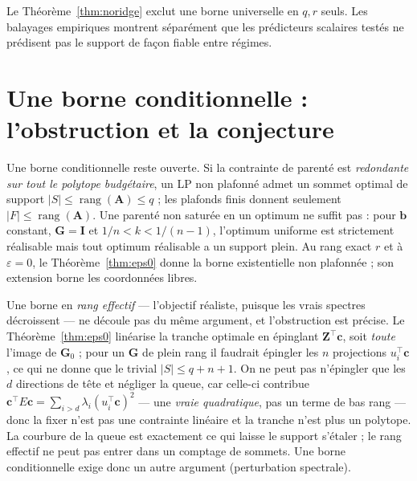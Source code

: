 \documentclass[11pt]{article}
\theoremstyle{plain}
\newcommand{\tp}{^{\top}}
\newcommand{\bc}{\mathbf{c}}
\newcommand{\bb}{\mathbf{b}}
\newcommand{\bG}{\mathbf{G}}
\newcommand{\bZ}{\mathbf{Z}}
\newcommand{\bA}{\mathbf{A}}
\begin{document}
Le Théorème~\ref{thm:noridge} exclut une borne universelle en $q,r$ seuls. Les balayages empiriques montrent séparément que les prédicteurs scalaires testés ne prédisent pas le support de façon fiable entre régimes.

\section{Une borne conditionnelle : l'obstruction et la conjecture}

Une borne conditionnelle reste ouverte. Si la contrainte de parenté est \emph{redondante sur tout le polytope budgétaire}, un LP non plafonné admet un sommet optimal de support $|S|\le\operatorname{rang}(\bA)\le q$ ; les plafonds finis donnent seulement $|F|\le\operatorname{rang}(\bA)$. Une parenté non saturée en un optimum ne suffit pas : pour $\bb$ constant, $\bG=\mathbf{I}$ et $1/n<k<1/(n-1)$, l'optimum uniforme est strictement réalisable mais tout optimum réalisable a un support plein. Au rang exact $r$ et à $\varepsilon=0$, le Théorème~\ref{thm:eps0} donne la borne existentielle non plafonnée ; son extension borne les coordonnées libres.

Une borne en \emph{rang effectif} --- l'objectif réaliste, puisque les vrais spectres décroissent ---
ne découle pas du même argument, et l'obstruction est précise. Le Théorème~\ref{thm:eps0} linéarise la
tranche optimale en épinglant $\bZ\tp\bc$, soit \emph{toute} l'image de $\bG_0$ ; pour un $\bG$ de
plein rang il faudrait épingler les $n$ projections $u_i\tp\bc$, ce qui ne donne que le trivial
$|S| \le q + n + 1$. On ne peut pas n'épingler que les $d$ directions de tête et négliger la queue, car
celle-ci contribue $\bc\tp E\bc = \sum_{i>d} \lambda_i (u_i\tp\bc)^2$ --- une \emph{vraie quadratique},
pas un terme de bas rang --- donc la fixer n'est pas une contrainte linéaire et la tranche n'est plus
un polytope. La courbure de la queue est exactement ce qui laisse le support s'étaler ; le rang
effectif ne peut pas entrer dans un comptage de sommets. Une borne conditionnelle exige donc un autre
argument (perturbation spectrale).
\end{document}
